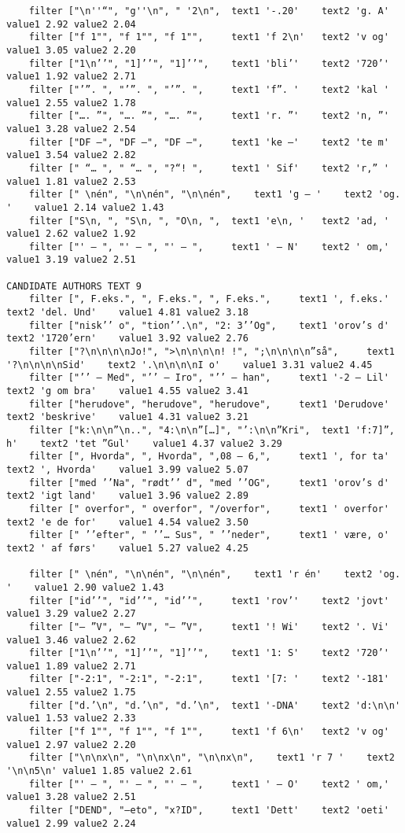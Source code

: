 {\begin{verbatim}
	filter ["\n''“", "g''\n", " '2\n", 	text1 '-.20'	text2 'g. A'	value1 2.92	value2 2.04
	filter ["f 1"", "f 1"", "f 1"", 	text1 'f 2\n'	text2 'v og'	value1 3.05	value2 2.20
	filter ["1\n’’", "1]’’", "1]’’", 	text1 'bli’'	text2 '720’'	value1 1.92	value2 2.71
	filter ["’”. ", "’”. ", "’”. ", 	text1 'f”. '	text2 'kal '	value1 2.55	value2 1.78
	filter ["…. ”", "…. ”", "…. ”", 	text1 'r. ”'	text2 'n, ”'	value1 3.28	value2 2.54
	filter ["DF –", "DF –", "DF –", 	text1 'ke –'	text2 'te m'	value1 3.54	value2 2.82
	filter [" “… ", " “… ", "?“! ", 	text1 ' Sif'	text2 'r,” '	value1 1.81	value2 2.53
	filter [" \nén", "\n\nén", "\n\nén", 	text1 'g – '	text2 'og. '	value1 2.14	value2 1.43
	filter ["S\n, ", "S\n, ", "O\n, ", 	text1 'e\n, '	text2 'ad, '	value1 2.62	value2 1.92
	filter ["' – ", "' – ", "' – ", 	text1 ' – N'	text2 ' om,'	value1 3.19	value2 2.51

CANDIDATE AUTHORS TEXT 9
	filter [", F.eks.", ", F.eks.", ", F.eks.", 	text1 ', f.eks.'	text2 'del. Und'	value1 4.81	value2 3.18
	filter ["nisk’’ o", "tion’’.\n", "2: 3’’Og", 	text1 'orov’s d'	text2 '1720’ern'	value1 3.92	value2 2.76
	filter ["?\n\n\n\nJo!", ">\n\n\n\n! !", ";\n\n\n\n”så", 	text1 '?\n\n\n\nSid'	text2 '.\n\n\n\nI o'	value1 3.31	value2 4.45
	filter ["’’ – Med", "’’ – Iro", "’’ – han", 	text1 '-2 – Lil'	text2 'g om bra'	value1 4.55	value2 3.41
	filter ["herudove", "herudove", "herudove", 	text1 'Derudove'	text2 'beskrive'	value1 4.31	value2 3.21
	filter ["k:\n\n”\n..", "4:\n\n”[…]", "’:\n\n”Kri", 	text1 'f:7]”, h'	text2 'tet ”Gul'	value1 4.37	value2 3.29
	filter [", Hvorda", ", Hvorda", ",08 – 6,", 	text1 ', for ta'	text2 ', Hvorda'	value1 3.99	value2 5.07
	filter ["med ’’Na", "rødt’’ d", "med ’’OG", 	text1 'orov’s d'	text2 'igt land'	value1 3.96	value2 2.89
	filter [" overfor", " overfor", "/overfor", 	text1 ' overfor'	text2 'e de for'	value1 4.54	value2 3.50
	filter [" ’’efter", " ’’… Sus", " ’’neder", 	text1 ' være, o'	text2 ' af førs'	value1 5.27	value2 4.25

	filter [" \nén", "\n\nén", "\n\nén", 	text1 'r én'	text2 'og. '	value1 2.90	value2 1.43
	filter ["id’’", "id’’", "id’’", 	text1 'rov’'	text2 'jovt'	value1 3.29	value2 2.27
	filter ["– ”V", "– ”V", "– ”V", 	text1 '! Wi'	text2 '. Vi'	value1 3.46	value2 2.62
	filter ["1\n’’", "1]’’", "1]’’", 	text1 '1: S'	text2 '720’'	value1 1.89	value2 2.71
	filter ["-2:1", "-2:1", "-2:1", 	text1 '[7: '	text2 '-181'	value1 2.55	value2 1.75
	filter ["d.’\n", "d.’\n", "d.’\n", 	text1 '-DNA'	text2 'd:\n\n'	value1 1.53	value2 2.33
	filter ["f 1"", "f 1"", "f 1"", 	text1 'f 6\n'	text2 'v og'	value1 2.97	value2 2.20
	filter ["\n\nx\n", "\n\nx\n", "\n\nx\n", 	text1 'r 7 '	text2 '\n\n5\n'	value1 1.85	value2 2.61
	filter ["' – ", "' – ", "' – ", 	text1 ' – O'	text2 ' om,'	value1 3.28	value2 2.51
	filter ["DEND", "–eto", "x?ID", 	text1 'Dett'	text2 'oeti'	value1 2.99	value2 2.24


\end{verbatim}}
